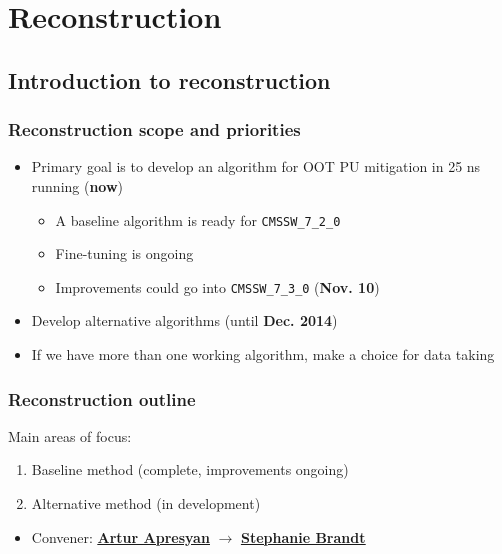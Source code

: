 \documentclass[bigger]{beamer}
\providecommand{\alert}[1]{\textbf{#1}}
\begin{document}
\section{Reconstruction}
\label{sec-3}
\subsection{Introduction to reconstruction}
\label{sec-3-1}
\begin{frame}
\frametitle{Reconstruction scope and priorities}
\label{sec-3-1-1}
\begin{itemize}

\item Primary goal is to develop an algorithm for OOT PU mitigation in 25 ns running (\alert{now})
\label{sec-3-1-1-1}%
\begin{itemize}

\item A baseline algorithm is ready for \texttt{CMSSW\_7\_2\_0}
\label{sec-3-1-1-1-1}%

\item Fine-tuning is ongoing
\label{sec-3-1-1-1-2}%

\item Improvements could go into \texttt{CMSSW\_7\_3\_0} (\alert{Nov. 10})
\label{sec-3-1-1-1-3}%
\end{itemize} %

\item Develop alternative algorithms (until \alert{Dec. 2014})
\label{sec-3-1-1-2}%

\item If we have more than one working algorithm, make a choice for data taking
\label{sec-3-1-1-3}%
\end{itemize} %
\end{frame}
\begin{frame}
\frametitle{Reconstruction outline}
\label{sec-3-1-2}
\begin{block}{Main areas of focus:}
\label{sec-3-1-2-1}

\begin{enumerate}
\item Baseline method (complete, improvements ongoing)
\item Alternative method (in development)
\end{enumerate}
\end{block}
\begin{itemize}

\item Convener: \href{mailto:artur.apresyan@cern.ch}{\underline{\alert{Artur Apresyan}}} $\rightarrow$ \href{mailto:s.brandt@cern.ch}{\underline{\alert{Stephanie Brandt}}}
\label{sec-3-1-2-2}%
\end{itemize} %
\end{frame}
\end{document}
